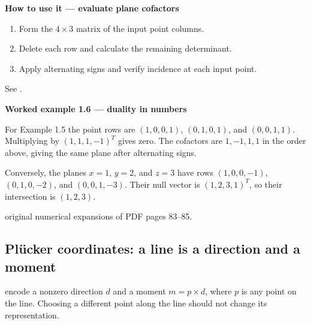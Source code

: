 \documentclass[letterpaper,11pt,english,openany,oneside]{jupyterBook}
\begin{document}
\begin{TextbookBox}
\textbf{How to use it — evaluate plane cofactors}\par\smallskip
\begin{enumerate}
%
\item {}
\sphinxAtStartPar
Form the \(4\times3\) matrix of the input point columns.

\item {}
\sphinxAtStartPar
Delete each row and calculate the remaining determinant.

\item {}
\sphinxAtStartPar
Apply alternating signs and verify incidence at each input point.

\end{enumerate}

\sphinxAtStartPar
See {\hyperref[\detokenize{lectures/lecture01/planes-lines:ex-lec01-null}]{}}.

\end{TextbookBox}
\label{\detokenize{lectures/lecture01/planes-lines:ex-lec01-null}}
\begin{TextbookBox}
\textbf{Worked example 1.6 — duality in numbers}\par\smallskip

\sphinxAtStartPar
For Example 1.5 the point rows are \((1,0,0,1)\), \((0,1,0,1)\), and \((0,0,1,1)\). Multiplying by \((1,1,1,-1)^T\) gives zero. The cofactors are \(1,-1,1,1\) in the order above, giving the same plane after alternating signs.

\sphinxAtStartPar
Conversely, the planes \(x=1\), \(y=2\), and \(z=3\) have rows \((1,0,0,-1)\), \((0,1,0,-2)\), and \((0,0,1,-3)\). Their null vector is \((1,2,3,1)^T\), so their intersection is \((1,2,3)\).

\sphinxAtStartPar
{} original numerical expansions of PDF pages 83–85.

\end{TextbookBox}


\subsection{Plücker coordinates: a line is a direction and a moment}
\label{\detokenize{lectures/lecture01/planes-lines:plucker-coordinates-a-line-is-a-direction-and-a-moment}}
\sphinxAtStartPar
{} encode a nonzero direction \(d\) and a moment \(m=p\times d\), where \(p\) is any point on the line. Choosing a different point along the line should not change its representation.
\end{document}
